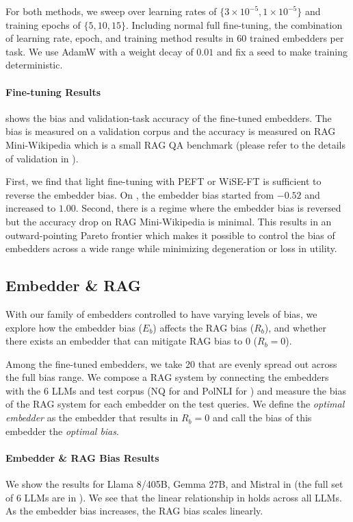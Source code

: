 For both methods, we sweep over learning rates of $\{3\times10^{-5}, 1\times10^{-5}\}$ and training epochs of $\{5, 10, 15\}$. Including normal full fine-tuning, the combination of learning rate, epoch, and training method results in 60 trained embedders per task. We use AdamW \citep{loshchilov2019decoupledweightdecayregularization} with a weight decay of $0.01$ and fix a seed to make training deterministic.

\paragraph{Fine-tuning Results}
 shows the bias and validation-task accuracy of the fine-tuned embedders. The bias is measured on a validation corpus and the accuracy is measured on RAG Mini-Wikipedia \cite{smith2008question} which is a small RAG QA benchmark (please refer to the details of validation in ).

First, we find that light fine-tuning with PEFT or WiSE-FT is sufficient to reverse the embedder bias. On \genderData, the embedder bias started from $-0.52$ and increased to $1.00$. Second, there is a regime where the embedder bias is reversed but the accuracy drop on RAG Mini-Wikipedia is minimal. This results in an outward-pointing Pareto frontier which makes it possible to control the bias of embedders across a wide range while minimizing degeneration or loss in utility. 

\subsection{Embedder \& RAG}
\label{sec:emb-rag}
With our family of embedders controlled to have varying levels of bias, we explore how the embedder bias ($E_b$) affects the RAG bias ($R_b$), and whether there exists an embedder that can mitigate RAG bias to 0 ($R_b=0$).

Among the fine-tuned embedders, we take 20 that are evenly spread out across the full bias range. We compose a RAG system by connecting the embedders with the 6 LLMs and test corpus (NQ for \genderData and PolNLI for \politicalData) and measure the bias of the RAG system for each embedder on the test queries. We define the \emph{optimal embedder} as the embedder that results in $R_b=0$ and call the bias of this embedder the \emph{optimal bias}.

\paragraph{Embedder \& RAG Bias Results}
We show the results for Llama 8/405B, Gemma 27B, and Mistral in  (the full set of 6 LLMs are in ). We see that the linear relationship in  holds across all LLMs. As the embedder bias increases, the RAG bias scales linearly. 

